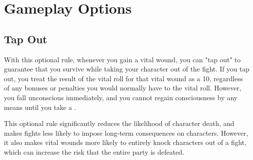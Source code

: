 \section{Gameplay Options}
    \subsection{Tap Out}
        With this optional rule, whenever you gain a vital wound, you can "tap out" to guarantee that you survive while taking your character out of the fight.
        If you tap out, you treat the result of the vital roll for that vital wound as a 10, regardless of any bonuses or penalties you would normally have to the vital roll.
        However, you fall unconscious immediately, and you cannot regain consciousness by any means until you take a .

        This optional rule significantly reduces the likelihood of character death, and makes fights less likely to impose long-term consequences on characters.
        However, it also makes vital wounds more likely to entirely knock characters out of a fight, which can increase the risk that the entire party is defeated.

